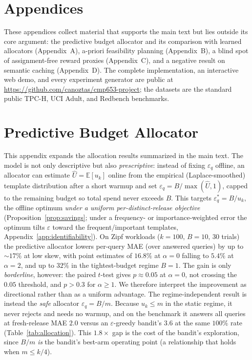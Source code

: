 \documentclass[sigconf,nonacm]{acmart}
\newcommand{\eps}{\varepsilon}
\newcommand{\E}{\mathbb{E}}
\begin{document}
\section*{Appendices}
\noindent These appendices collect material that supports the main text but lies outside its core argument: the predictive budget allocator and its comparison with learned allocators (Appendix~A), a-priori feasibility planning (Appendix~B), a blind spot of assignment-free reward proxies (Appendix~C), and a negative result on semantic caching (Appendix~D). The complete implementation, an interactive web demo, and every experiment generator are public at \url{https://github.com/canoztas/cmp653-project}; the datasets are the standard public TPC-H, UCI Adult, and Redbench benchmarks.

\section{Predictive Budget Allocator}
\label{app:allocator}

This appendix expands the allocation results summarized in the main text. The model is not only descriptive but also \emph{prescriptive}: instead of fixing $\eps_q$ offline, an allocator can estimate $\hat U=\E[u_{k}]$ online from the empirical (Laplace-smoothed) template distribution after a short warmup and set $\eps_q=B/\max(\hat U,1)$, capped to the remaining budget so total spend never exceeds $B$. This targets $\eps_q^*=B/u_k$, the offline optimum \emph{under a uniform per-distinct-release objective} (Proposition~\ref{prop:savings}; under a frequency- or importance-weighted error the optimum tilts $\eps$ toward the frequent/important templates, Appendix~\ref{app:identifiability}). On Zipf workloads ($k{=}100$, $B{=}10$, 30 trials) the predictive allocator lowers per-query MAE (over answered queries) by up to $\sim$$17\%$ at low skew, with point estimates of $16.8\%$ at $\alpha{=}0$ falling to $5.4\%$ at $\alpha{=}2$, and up to $32\%$ in the tightest-budget regime $B{=}1$. The gain is only \emph{borderline}, however: the paired $t$-test gives $p\approx0.05$ at $\alpha{=}0$, not crossing the $0.05$ threshold, and $p>0.3$ for $\alpha\ge1$. We therefore interpret the improvement as directional rather than as a uniform advantage. The regime-independent result is instead the \emph{safe} allocator $\eps_q{=}B/m$. Because $u_k\le m$ in the static regime, it never rejects and needs no warmup, and on the benchmark it answers all queries at fresh-release MAE $2.0$ versus an $\eps$-greedy bandit's $3.6$ at the same $100\%$ rate (Table~\ref{tab:allocation}). This $1.8\times$ gap is the cost of the bandit's exploration, since $B/m$ \emph{is} the bandit's best-arm operating point (a relationship that holds when $m\le k/4$).
\end{document}
